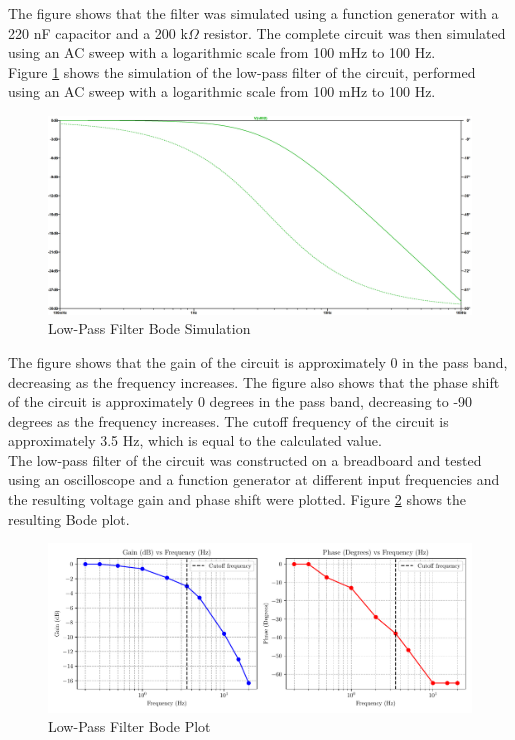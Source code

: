 \documentclass[CMPE]{KGCOEReport}
\begin{document}
The figure shows that the filter was simulated using a function generator with a 220 nF capacitor and a 200 k$\Omega$ resistor. The complete circuit was then simulated using an AC sweep with a logarithmic scale from 100 mHz to 100 Hz.\\

Figure \ref{fig:lowPassSim} shows the simulation of the low-pass filter of the circuit, performed using an AC sweep with a logarithmic scale from 100 mHz to 100 Hz.

\begin{figure}[H]
    \centering
    \includegraphics[width=1\textwidth]{SimFreqLowPass.png}
    \caption{Low-Pass Filter Bode Simulation}
    \label{fig:lowPassSim}
\end{figure}

The figure shows that the gain of the circuit is approximately 0 in the pass band, decreasing as the frequency increases. The figure also shows that the phase shift of the circuit is approximately 0 degrees in the pass band, decreasing to -90 degrees as the frequency increases. The cutoff frequency of the circuit is approximately 3.5 Hz, which is equal to the calculated value.\\

The low-pass filter of the circuit was constructed on a breadboard and tested using an oscilloscope and a function generator at different input frequencies and the resulting voltage gain and phase shift were plotted. Figure \ref{fig:lowPassBode} shows the resulting Bode plot.

\begin{figure}[H]
    \centering
    \includegraphics[width=1\textwidth]{low_pass_plot.pdf}
    \caption{Low-Pass Filter Bode Plot}
    \label{fig:lowPassBode}
\end{figure}
\end{document}
